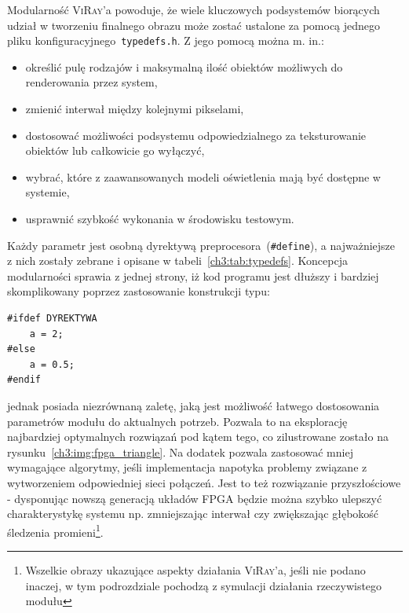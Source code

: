 Modularność \textsc{ViRay}'a powoduje, że wiele kluczowych podsystemów biorących udział w tworzeniu finalnego obrazu może zostać ustalone za pomocą jednego pliku konfiguracyjnego~\texttt{typedefs.h}. Z jego pomocą można m. in.:
\begin{itemize}
\item określić pulę rodzajów i maksymalną ilość obiektów możliwych do renderowania przez system,
\item zmienić interwał między kolejnymi pikselami,
\item dostosować możliwości podsystemu odpowiedzialnego za teksturowanie obiektów lub całkowicie go wyłączyć,
\item wybrać, które z zaawansowanych modeli oświetlenia mają być dostępne w systemie,
\item usprawnić szybkość wykonania w środowisku testowym.
\end{itemize}
Każdy parametr jest osobną dyrektywą preprocesora~(\texttt{\#define}), a najważniejsze z nich zostały zebrane i opisane w tabeli~\ref{ch3:tab:typedefs}. Koncepcja modularności sprawia z jednej strony, iż kod programu jest dłuższy i bardziej skomplikowany poprzez zastosowanie konstrukcji typu:
\begin{lstlisting}
#ifdef DYREKTYWA
	a = 2;
#else
	a = 0.5;
#endif
\end{lstlisting}
jednak posiada niezrównaną zaletę, jaką jest możliwość łatwego dostosowania parametrów modułu do aktualnych potrzeb. Pozwala to na eksplorację najbardziej optymalnych rozwiązań pod kątem tego, co zilustrowane zostało na rysunku~\ref{ch3:img:fpga_triangle}. Na dodatek pozwala zastosować mniej wymagające algorytmy, jeśli implementacja napotyka problemy związane z wytworzeniem odpowiedniej sieci połączeń. Jest to też rozwiązanie przyszłościowe - dysponując nowszą generacją układów FPGA będzie można szybko ulepszyć charakterystykę systemu np. zmniejszając interwał czy zwiększając głębokość śledzenia promieni\footnote{Wszelkie obrazy ukazujące aspekty działania \textsc{ViRay}'a, jeśli nie podano inaczej, w tym podrozdziale pochodzą z symulacji działania rzeczywistego modułu}.



